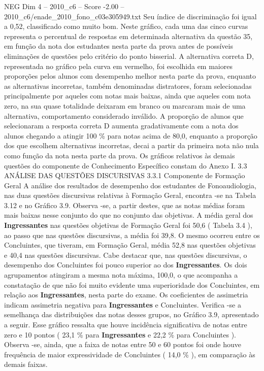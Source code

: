 \begin{textsample}{NEG Dim 4 – 2010\_c6 – Score -2.00 – 2010\_c6/enade\_2010\_fono\_c03e305949.txt}
Seu índice de discriminação foi igual a 0,52, classificado como muito bom.
Neste gráfico, cada uma das cinco curvas representa o percentual de respostas em determinada alternativa da questão 35, em função da nota dos estudantes nesta parte da prova antes de possíveis eliminações de questões pelo critério do ponto bisserial.
A alternativa correta D, representada no gráfico pela curva em vermelho, foi escolhida em maiores proporções pelos alunos com desempenho melhor nesta parte da prova, enquanto as alternativas incorretas, também denominadas distratores, foram selecionadas principalmente por aqueles com notas mais baixas, ainda que aqueles com nota zero, na sua quase totalidade deixaram em branco ou marcaram mais de uma alternativa, comportamento considerado inválido.
A proporção de alunos que selecionaram a resposta correta D aumenta gradativamente com a nota dos alunos chegando a atingir 100 \% para notas acima de 80,0, enquanto a proporção dos que escolhem alternativas incorretas, decai a partir da primeira nota não nula como função da nota nesta parte da prova.
Os gráficos relativos às demais questões do componente de Conhecimento Específico constam do Anexo I. 3.3 ANÁLISE DAS QUESTÕES DISCURSIVAS 3.3.1 Componente de Formação Geral A análise dos resultados de desempenho dos estudantes de Fonoaudiologia, nas duas questões discursivas relativas à Formação Geral, encontra -se na Tabela 3.12 e no Gráfico 3.9.
Observa -se, a partir destes, que as notas médias foram mais baixas nesse conjunto do que no conjunto das objetivas.
A média geral dos \textbf{Ingressantes} nas questões objetivas de Formação Geral foi 50,6 ( Tabela 3.4 ), ao passo que nas questões discursivas, a média foi 39,8.
O mesmo ocorreu entre os Concluintes, que tiveram, em Formação Geral, média 52,8 nas questões objetivas e 40,4 nas questões discursivas.
Cabe destacar que, nas questões discursivas, o desempenho dos Concluintes foi pouco superior ao dos \textbf{Ingressantes}.
Os dois agrupamentos atingiram a mesma nota máxima, 100,0, o que acompanha a constatação de que não foi muito evidente uma superioridade dos Concluintes, em relação aos \textbf{Ingressantes}, nesta parte do exame.
Os coeficientes de assimetria indicam assimetria negativa para \textbf{Ingressantes} e Concluintes.
Verifica -se a semelhança das distribuições das notas desses grupos, no Gráfico 3.9, apresentado a seguir.
Esse gráfico ressalta que houve incidência significativa de notas entre zero e 10 pontos ( 23,1 \% para \textbf{Ingressantes} e 22,2 \% para Concluintes ).
Observa -se, ainda, que a faixa de notas entre 50 e 60 pontos foi onde houve frequência de maior expressividade de Concluintes ( 14,0 \% ), em comparação às demais faixas.

\end{textsample}
